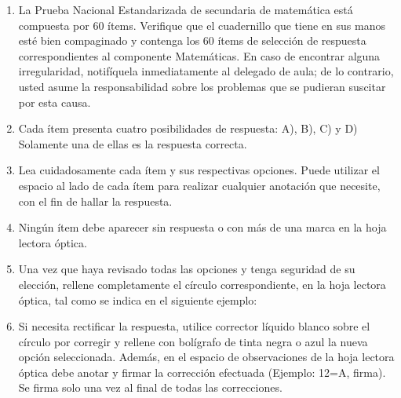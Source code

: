 \documentclass[11pt]{article}
\begin{document}
\begin{enumerate}[leftmargin=*, itemsep=3pt, topsep=2pt, parsep=0pt]
  \item La Prueba Nacional Estandarizada de secundaria de matem\'atica est\'a compuesta por 60 \'items. Verifique que el cuadernillo que tiene en sus manos est\'e bien compaginado y contenga los 60 \'items de selecci\'on de respuesta correspondientes al componente Matem\'aticas. En caso de encontrar alguna irregularidad, notif\'iquela inmediatamente al delegado de aula; de lo contrario, usted asume la responsabilidad sobre los problemas que se pudieran suscitar por esta causa.

  \item Cada \'item presenta cuatro posibilidades de respuesta: A), B), C) y D) Solamente una de ellas es la respuesta correcta.

  \item Lea cuidadosamente cada \'item y sus respectivas opciones. Puede utilizar el espacio al lado de cada \'item para realizar cualquier anotaci\'on que necesite, con el fin de hallar la respuesta.

  \item Ning\'un \'item debe aparecer sin respuesta o con m\'as de una marca en la hoja lectora \'optica.

  \item Una vez que haya revisado todas las opciones y tenga seguridad de su elecci\'on, rellene completamente el c\'irculo correspondiente, en la hoja lectora \'optica, tal como se indica en el siguiente ejemplo:

  \begin{center}
  \end{center}

  \item Si necesita rectificar la respuesta, utilice corrector l\'iquido blanco sobre el c\'irculo por corregir y rellene con bol\'igrafo de tinta negra o azul la nueva opci\'on seleccionada. Adem\'as, en el espacio de observaciones de la hoja lectora \'optica debe anotar y firmar la correcci\'on efectuada (Ejemplo: 12=A, firma). Se firma solo una vez al final de todas las correcciones.
\end{enumerate}
\end{document}
